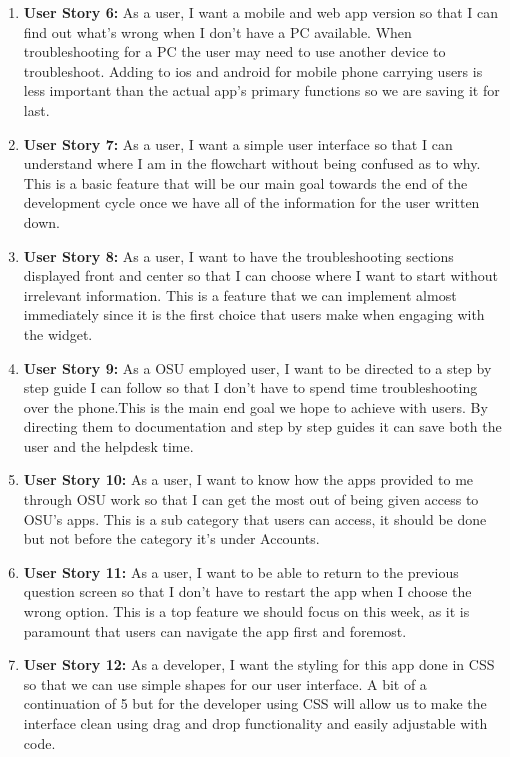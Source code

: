 \documentclass[12pt, letterpaper]{article}
\begin{document}
\begin{enumerate}
		\item \textbf{User Story 6:}
		As a user, I want a mobile and web app version so that I can find out what’s wrong when I don’t have a PC available. When troubleshooting for a PC the user may need to use another device to troubleshoot. Adding to ios and android for mobile phone carrying users is less important than the actual app’s primary functions so we are saving it for last.
		\item \textbf{User Story 7:}
		As a user, I want a simple user interface so that I can understand where I am in the flowchart without being confused as to why. This is a basic feature that will be our main goal towards the end of the development cycle once we have all of the information for the user written down. 
		\item \textbf{User Story 8:}
		As a user, I want to have the troubleshooting sections displayed front and center so that I can choose where I want to start without irrelevant information. This is a feature that we can implement almost immediately since it is the first choice that users make when engaging with the widget.
		\item \textbf{User Story 9:}
		As a OSU employed user, I want to be directed to a step by step guide I can follow so that I don’t have to spend time troubleshooting over the phone.This is the main end goal we hope to achieve with users. By directing them to documentation and step by step guides it can save both the user and the helpdesk time. 
		\item \textbf{User Story 10:}
		As a user, I want to know how the apps provided to me through OSU work so that I can get the most out of being given access to OSU’s apps. This is a sub category that users can access, it should be done but not before the category it’s under Accounts.
		\item \textbf{User Story 11:}
		As a user, I want to be able to return to the previous question screen so that I don’t have to restart the app when I choose the wrong option. This is a top feature we should focus on this week, as it is paramount that users can navigate the app first and foremost.
		\item \textbf{User Story 12:}
		As a developer, I want the styling for this app done in CSS so that we can use simple shapes for our user interface. A bit of a continuation of 5 but for the developer using CSS will allow us to make the interface clean using drag and drop functionality and easily adjustable with code.
	\end{enumerate}
	
\end{document}
